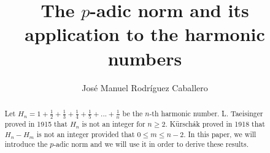 \documentclass[11pt,a4paper]{article}
\begin{document}
\title{The $p$-adic norm and its application to the harmonic numbers}
\author{Jos\'e Manuel Rodr\'iguez Caballero}
\maketitle

\begin{abstract}
Let $H_n = 1 + \frac{1}{2} + \frac{1}{3} + \frac{1}{4} + \frac{1}{5} + ... + \frac{1}{n}$ be the $n$-th harmonic number.
L. Taeisinger \cite{theisinger1915bemerkung} proved in 1915 that $H_n$ is not an integer for $n \geq 2$. K\"ursch\'ak \cite{kurschak1918harmonic} proved in 1918 that $H_n - H_m$ is not an integer provided that $0 \leq m \leq n-2$. In this paper, we will introduce the $p$-adic norm and we will use it in order to derive these results.
\end{abstract}

\tableofcontents






\end{document}
